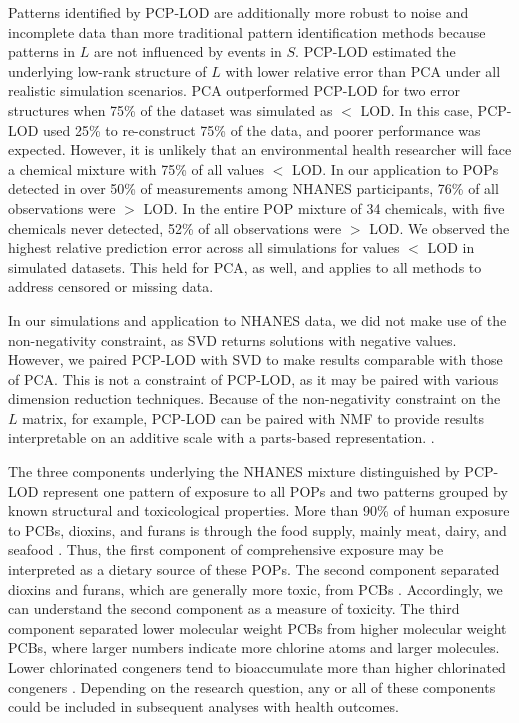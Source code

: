 Patterns identified by PCP-LOD are additionally more robust to noise and incomplete data than more traditional pattern identification methods because patterns in $L$ are not influenced by events in $S$. PCP-LOD estimated the underlying low-rank structure of $L$ with lower relative error than PCA under all realistic simulation scenarios. PCA outperformed PCP-LOD for two error structures when 75\% of the dataset was simulated as $<$ LOD. In this case, PCP-LOD used 25\% to re-construct 75\% of the data, and poorer performance was expected. However, it is unlikely that an environmental health researcher will face a chemical mixture with 75\% of all values $<$ LOD. In our application to POPs detected in over 50\% of measurements among NHANES participants, 76\% of all observations were $>$ LOD. In the entire POP mixture of 34 chemicals, with five chemicals never detected, 52\% of all observations were $>$ LOD. We observed the highest relative prediction error across all simulations for values $<$ LOD in simulated datasets. This held for PCA, as well, and applies to all methods to address censored or missing data.

In our simulations and application to NHANES data, we did not make use of the non-negativity constraint, as SVD returns solutions with negative values. However, we paired PCP-LOD with SVD to make results comparable with those of PCA. This is not a constraint of PCP-LOD, as it may be paired with various dimension reduction techniques. Because of the non-negativity constraint on the $L$ matrix, for example, PCP-LOD can be paired with NMF to provide results interpretable on an additive scale with a parts-based representation. \citep{lee1999learning}.

The three components underlying the NHANES mixture distinguished by PCP-LOD represent one pattern of exposure to all POPs and two patterns grouped by known structural and toxicological properties. More than 90\% of human exposure to PCBs, dioxins, and furans is through the food supply, mainly meat, dairy, and seafood \citep{faroon2000toxicological, world1999dioxins, loganathan2020pcbs}. Thus, the first component of comprehensive exposure may be interpreted as a dietary source of these POPs. The second component separated dioxins and furans, which are generally more toxic, from PCBs \citep{iarc2012review}. Accordingly, we can understand the second component as a measure of toxicity. The third component separated lower molecular weight PCBs from higher molecular weight PCBs, where larger numbers indicate more chlorine atoms and larger molecules. Lower chlorinated congeners tend to bioaccumulate more than higher chlorinated congeners \citep{steele1986estimates, hopf2009background}. Depending on the research question, any or all of these components could be included in subsequent analyses with health outcomes.

